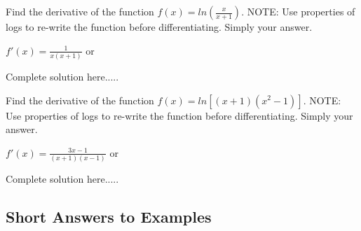 \newpage
\begin{example}
Find the derivative of the function $f(x)=ln\left(\displaystyle\frac{x}{x+1}\right)$.
NOTE:  Use properties of logs to re-write the function before differentiating.	Simply your answer. 

    \begin{sol}
    $f'(x)=\displaystyle\frac{1}{x(x+1)}$ or \displaystyle{}
    \end{sol}
    \begin{solL}
    Complete solution here.....
    
    \end{solL}
    
\end{example}
\begin{example}
Find the derivative of the function $f(x)=ln\left[(x+1)(x^2-1)\right]$.
NOTE:  Use properties of logs to re-write the function before differentiating.	Simply your answer. 

    \begin{sol}
    $f'(x)=\displaystyle\frac{3x-1}{(x+1)(x-1)}$ or \displaystyle{}
    \end{sol}
    \begin{solL}
    Complete solution here.....
    
    \end{solL}
    
\end{example}




\vspace*{\fill}

\subsection*{Short Answers to Examples}
\begin{multicols}{2}

\end{multicols}


